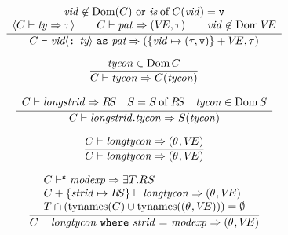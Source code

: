 \begin{equation}	%
\label{layeredpat-rule}
\frac{\begin{array}{c}
      \vid\not\in\Dom(\C)\ {\rm or}\ \of{\is}{\C(\vid)}=\vstatus\\
      \langle\C\ts\ty\ra\tau\rangle \qquad
      \C\ts\pat\ra(\VE,\tau) \qquad
      \vid \not \in \Dom \VE
      \end{array}
     }
     {\C\ts\layeredpat\ra(\plusmap{\{\vid\mapsto(\tau,\vstatus)\}}{\VE},\tau)}
\end{equation}



\begin{equation}	%
\label{idlongtycon-rule}
\frac{\tycon\in\Dom\C}
     {\C\ts\idlongid{\tycon}\ra\C(\tycon)}
\end{equation}

\begin{equation}	%
\frac{\begin{array}{lcr}
      \C\ts\longstrid\ra\RS &
      \S = \of\S\RS&
      \tycon\in\Dom\S
      \end{array}
      }
     {\C\ts\dotlongid{\longstrid}{\tycon}\ra\S(\tycon)}
\end{equation}


\begin{equation}	%
\label{longtyconpath-rule}
\frac{\C\ts\longtycon\ra(\typefnc,\VE)}
     {\C\ts\longtyconpath\ra(\typefnc,\VE)}
\end{equation}

\begin{equation}	%
\label{anontyconpath-rule}
\frac{\begin{array}{l}
      \C\ts^\expectstr\modexp\ra\exmod{\T}{RS} \\
      \C+\{\strid\mapsto\RS\}\ts\longtyconpath\ra(\typefnc,\VE)\\
      \T\cap(\TyNamesFcn(\C) \cup \TyNamesFcn((\typefnc,\VE))) = \emptyset 
      \end{array}
      }
     {\C\ts\anontyconpath\ra(\typefnc,\VE)}
\end{equation}


